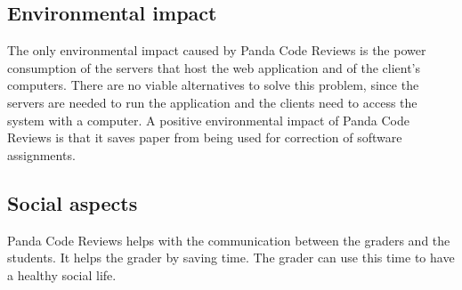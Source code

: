 \subsection{Environmental impact}
The only environmental impact caused by Panda Code Reviews is the power consumption of the
servers that host the web application and of the client's computers. There are no viable
alternatives to solve this problem, since the servers are needed to run the application and
the clients need to access the system with a computer. A positive environmental impact of
Panda Code Reviews is that it saves paper from being used for correction of software
assignments.

\subsection{Social aspects}
Panda Code Reviews helps with the communication between the graders and the students. It
helps the grader by saving time. The grader can use this time to have a healthy social life.
